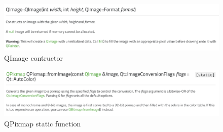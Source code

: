 \begin{figure}[ht]
\centering
\includegraphics[width = 0.95\hsize]{./figures/QImage}
\caption{QImage contructor}
\end{figure}


\begin{figure}[ht]
\centering
\includegraphics[width = 0.95\hsize]{./figures/QPixmap}
\caption{QPixmap static function}
\end{figure}